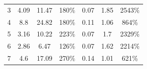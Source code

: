 \documentclass[fleqn,10pt]{wlscirep}
\begin{document}
\begin{table}[h!]
\begin{tabular}{|c|c|c|c|c|c|c|}
3                                                             & 4.09                                                                                      & 11.47                                                                                    & 180\%                                                                & 0.07                                                                                          & 1.85                                                                                         & 2543\%                                                                   \\
4                                                             & 8.8                                                                                       & 24.82                                                                                    & 180\%                                                                & 0.11                                                                                          & 1.06                                                                                         & 864\%                                                                    \\
5                                                             & 3.16                                                                                      & 10.22                                                                                    & 223\%                                                                & 0.07                                                                                          & 1.7                                                                                          & 2329\%                                                                   \\
6                                                             & 2.86                                                                                      & 6.47                                                                                     & 126\%                                                                & 0.07                                                                                          & 1.62                                                                                         & 2214\%                                                                   \\
7                                                             & 4.6                                                                                       & 17.09                                                                                    & 270\%                                                                & 0.14                                                                                          & 1.01                                                                                         & 621\%                                                                    \\

\end{tabular}
\end{table}
\end{document}
